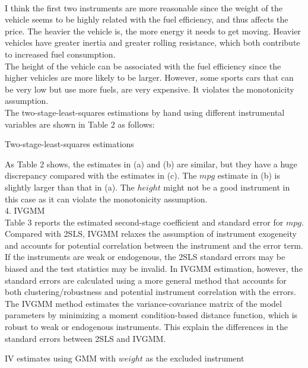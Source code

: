 \documentclass{article}
\begin{document}
\\ I think the first two instruments are more reasonable since the weight of the vehicle seems to be highly related with the fuel efficiency, and thus affects the price. The heavier the vehicle is, the more energy it needs to get moving. Heavier vehicles have greater inertia and greater rolling resistance, which both contribute to increased fuel consumption. 
\\ The height of the vehicle can be associated with the fuel efficiency since the higher vehicles are more likely to be larger. However, some sports cars that can be very low but use more fuels, are very expensive. It violates the monotonicity assumption. 
\smallskip
\\The two-stage-least-squares estimations by hand using different instrumental variables are shown in Table 2 as follows:
\begin{table}[H]
    \centering
    
    \caption{Two-stage-least-squares estimations}
    \label{tab:Q3}
\end{table}
\smallskip
\noindent
As Table 2 shows, the estimates in (a) and (b) are similar, but they have a huge discrepancy compared with the estimates in (c). The $mpg$ estimate in (b) is slightly larger than that in (a). The $height$ might not be a good instrument in this case as it can violate the monotonicity assumption.
\bigskip
\\
4. IVGMM
\smallskip
\\ Table 3 reports the estimated second-stage coefficient and standard error for $mpg$. 
\\ Compared with 2SLS, IVGMM relaxes the assumption of instrument exogeneity and accounts for potential correlation between the instrument and the error term. If the instruments are weak or endogenous, the 2SLS standard errors may be biased and the test statistics may be invalid. In IVGMM estimation, however, the standard errors are calculated using a more general method that accounts for both clustering/robustness and potential instrument correlation with the errors. The IVGMM method estimates the variance-covariance matrix of the model parameters by minimizing a moment condition-based distance function, which is robust to weak or endogenous instruments. This explain the differences in the standard errors between 2SLS and IVGMM.
\begin{table}[H]
    \centering
    
    \caption{IV estimates using GMM with $weight$ as the excluded instrument}
    \label{tab:Q4}
\end{table}
\smallskip
\end{document}
